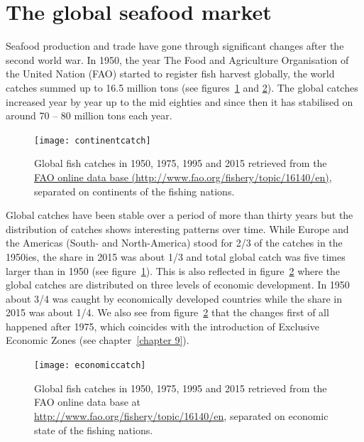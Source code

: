 \documentclass[11pt,fleqn]{book} %
\begin{document}
\section{The global seafood market}\label{seafood market}
Seafood production and trade have gone through significant changes after the second world war. In 1950, the year The Food and Agriculture Organisation of the United Nation (FAO) started to register fish harvest globally, the world catches summed up to 16.5 million tons (see figures~\ref{fig:worldcatches1} and \ref{fig:worldcatches2}). The global catches increased year by year up to the mid eighties and since then it has stabilised on around 70 -- 80 million tons each year.

\begin{figure}[ht]
\centering
\texttt{[image: continentcatch]}
\caption{Global fish catches in 1950, 1975, 1995 and 2015 retrieved from the \href{http://www.fao.org/fishery/topic/16140/en}{FAO online data base (http://www.fao.org/fishery/topic/16140/en)}, separated on continents of the fishing nations.}
\label{fig:worldcatches1}
\end{figure}

Global catches have been stable over a period of more than thirty years but the distribution of catches shows interesting patterns over time. While Europe and the Americas (South- and North-America) stood for 2/3 of the catches in the 1950ies, the share in 2015 was about 1/3 and total global catch was five times larger than in 1950 (see figure~\ref{fig:worldcatches1}). This is also reflected in figure~\ref{fig:worldcatches2} where the global catches are distributed on three levels of economic development. In 1950 about 3/4 was caught by economically developed countries while the share in 2015 was about 1/4. We also see from figure~\ref{fig:worldcatches2} that the changes first of all happened after 1975, which coincides with the introduction of Exclusive Economic Zones (see chapter~\ref{chapter 9}). 

\begin{figure}[ht]
\centering
\texttt{[image: economiccatch]}
\caption{Global fish catches in 1950, 1975, 1995 and 2015 retrieved from the FAO online data base at \href{http://www.fao.org/fishery/topic/16140/en}{http://www.fao.org/fishery/topic/16140/en}, separated on economic state of the fishing nations.}
\label{fig:worldcatches2}
\end{figure}
\end{document}
